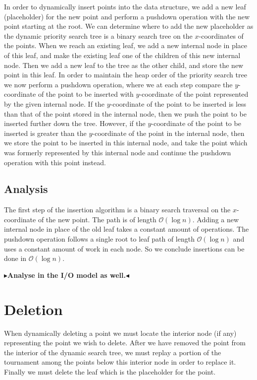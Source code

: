 \documentclass[twoside,11pt,openright]{report}
\newcommand{\todo}[1]{{\color[rgb]{.5,0,0}\textbf{$\blacktriangleright$#1$\blacktriangleleft$}}}
\begin{document}
In order to dynamically insert points into the data structure, we add a new leaf (placeholder) for the new point and perform a pushdown operation with the new point starting at the root. We can determine where to add the new placeholder as the dynamic priority search tree is a binary search tree on the $x$-coordinates of the points. When we reach an existing leaf, we add a new internal node in place of this leaf, and make the existing leaf one of the children of this new internal node. Then we add a new leaf to the tree as the other child, and store the new point in this leaf. In order to maintain the heap order of the priority search tree we now perform a pushdown operation, where we at each step compare the $y$-coordinate of the point to be inserted with $y$-coordinate of the point represented by the given internal node. If the $y$-coordinate of the point to be inserted is less than that of the point stored in the internal node, then we push the point to be inserted further down the tree. However, if the $y$-coordinate of the point to be inserted is greater than the $y$-coordinate of the point in the internal node, then we store the point to be inserted in this internal node, and take the point which was formerly represented by this internal node and continue the pushdown operation with this point instead.

\subsection*{Analysis}

The first step of the insertion algorithm is a binary search traversal on the $x$-coordinate of the new point. The path is of length $\mathcal{O}(\log n)$. Adding a new internal node in place of the old leaf takes a constant amount of operations. The pushdown operation follows a single root to leaf path of length $\mathcal{O}(\log n)$ and uses a constant amount of work in each node. So we conclude insertions can be done in $\mathcal{O}(\log n)$.

\todo{Analyse in the I/O model as well.}

\section{Deletion}

When dynamically deleting a point we must locate the interior node (if any) representing the point we wish to delete. After we have removed the point from the interior of the dynamic search tree, we must replay a portion of the tournament among the points below this interior node in order to replace it. Finally we must delete the leaf which is the placeholder for the point.
\end{document}
